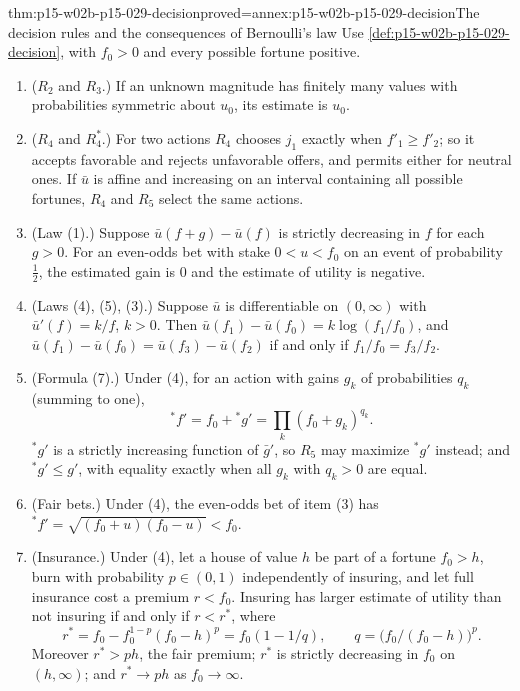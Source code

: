 \begin{hbtheorem}{thm:p15-w02b-p15-029-decision}{proved=annex:p15-w02b-p15-029-decision}{The decision rules and the consequences of Bernoulli's law}
Use \cref{def:p15-w02b-p15-029-decision}, with \(f_0>0\) and every
possible fortune positive.
\begin{enumerate}
 \item (\(R_2\) and \(R_3\).) If an unknown magnitude has finitely many
       values with probabilities symmetric about \(u_0\), its estimate
       is \(u_0\).
 \item (\(R_4\) and \(R_4^*\).) For two actions \(R_4\) chooses
       \(j_1\) exactly when \(f'_1\geq f'_2\); so it accepts favorable
       and rejects unfavorable offers, and permits either for neutral
       ones. If \(\bar u\) is affine and increasing on an interval
       containing all possible fortunes, \(R_4\) and \(R_5\) select the
       same actions.
 \item (Law (1).) Suppose \(\bar u(f+g)-\bar u(f)\) is strictly
       decreasing in \(f\) for each \(g>0\). For an even-odds bet with
       stake \(0<u<f_0\) on an event of probability \(\tfrac12\), the
       estimated gain is \(0\) and the estimate of utility is negative.
 \item (Laws (4), (5), (3).) Suppose \(\bar u\) is differentiable on
       \((0,\infty)\) with \(\bar u'(f)=k/f\), \(k>0\). Then
       \(\bar u(f_1)-\bar u(f_0)=k\log(f_1/f_0)\), and
       \(\bar u(f_1)-\bar u(f_0)=\bar u(f_3)-\bar u(f_2)\) if and only
       if \(f_1/f_0=f_3/f_2\).
 \item (Formula (7).) Under (4), for an action with gains \(g_k\) of
       probabilities \(q_k\) (summing to one),
       \[
        {}^*f'=f_0+{}^*g'=\prod_k(f_0+g_k)^{q_k}.
       \]
       \({}^*g'\) is a strictly increasing function of \(\bar g'\), so
       \(R_5\) may maximize \({}^*g'\) instead; and \({}^*g'\leq g'\), with
       equality exactly when all \(g_k\) with \(q_k>0\) are equal.
 \item (Fair bets.) Under (4), the even-odds bet of item (3) has
       \({}^*f'=\sqrt{(f_0+u)(f_0-u)}<f_0\).
 \item (Insurance.) Under (4), let a house of value \(h\) be part of a
       fortune \(f_0>h\), burn with probability \(p\in(0,1)\)
       independently of insuring, and let full insurance cost a premium
       \(r<f_0\). Insuring has larger estimate of utility than not
       insuring if and only if \(r<r^*\), where
       \[
        r^*=f_0-f_0^{1-p}(f_0-h)^p=f_0(1-1/q),\qquad
        q=\bigl(f_0/(f_0-h)\bigr)^p.
       \]
       Moreover \(r^*>ph\), the fair premium; \(r^*\) is strictly
       decreasing in \(f_0\) on \((h,\infty)\); and \(r^*\to ph\) as
       \(f_0\to\infty\).
\end{enumerate}
\end{hbtheorem}

